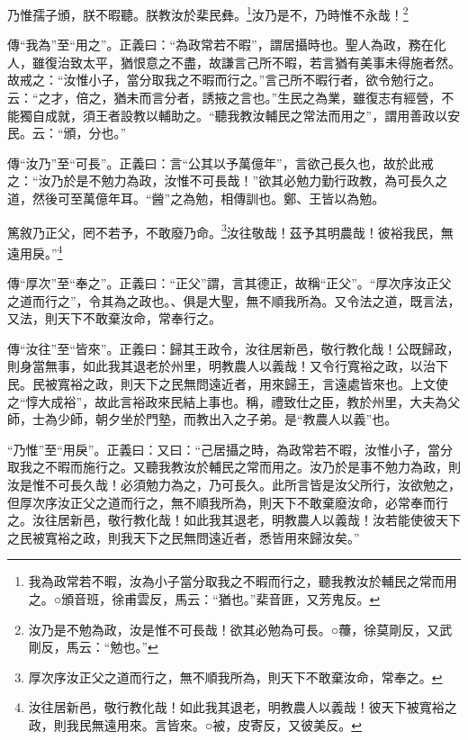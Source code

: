 乃惟孺子頒，朕不暇聽。朕教汝於棐民彝。\footnote{我為政常若不暇，汝為小子當分取我之不暇而行之，聽我教汝於輔民之常而用之。○頒音班，徐甫雲反，馬云：“猶也。”棐音匪，又芳鬼反。}汝乃是不，乃時惟不永哉！\footnote{汝乃是不勉為政，汝是惟不可長哉！欲其必勉為可長。○蘉，徐莫剛反，又武剛反，馬云：“勉也。”}

{\noindent\zhuan{}\fzbyks 傳“我為”至“用之”。正義曰：“為政常若不暇”，謂居攝時也。聖人為政，務在化人，雖復治致太平，猶恨意之不盡，故謙言己所不暇，若言猶有美事未得施者然。故戒之：“汝惟小子，當分取我之不暇而行之。”言己所不暇行者，欲令勉行之。云：“之才，倍之，猶未而言分者，誘掖之言也。”生民之為業，雖復志有經營，不能獨自成就，須王者設教以輔助之。“聽我教汝輔民之常法而用之”，謂用善政以安民。云：“頒，分也。” \par}

{\noindent\zhuan{}\fzbyks 傳“汝乃”至“可長”。正義曰：言“公其以予萬億年”，言欲己長久也，故於此戒之：“汝乃於是不勉力為政，汝惟不可長哉！”欲其必勉力勤行政教，為可長久之道，然後可至萬億年耳。“醟”之為勉，相傳訓也。鄭、王皆以為勉。 \par}

篤敘乃正父，罔不若予，不敢廢乃命。\footnote{厚次序汝正父之道而行之，無不順我所為，則天下不敢棄汝命，常奉之。}汝往敬哉！茲予其明農哉！彼裕我民，無遠用戾。”\footnote{汝往居新邑，敬行教化哉！如此我其退老，明教農人以義哉！彼天下被寬裕之政，則我民無遠用來。言皆來。○被，皮寄反，又彼美反。}

{\noindent\zhuan{}\fzbyks 傳“厚次”至“奉之”。正義曰：“正父”謂，言其德正，故稱“正父”。“厚次序汝正父之道而行之”，令其為之政也。、俱是大聖，無不順我所為。又令法之道，既言法，又法，則天下不敢棄汝命，常奉行之。 \par}

{\noindent\zhuan{}\fzbyks 傳“汝往”至“皆來”。正義曰：歸其王政令，汝往居新邑，敬行教化哉！公既歸政，則身當無事，如此我其退老於州里，明教農人以義哉！又令行寬裕之政，以治下民。民被寬裕之政，則天下之民無問遠近者，用來歸王，言遠處皆來也。上文使之“惇大成裕”，故此言裕政來民結上事也。稱，禮致仕之臣，教於州里，大夫為父師，士為少師，朝夕坐於門塾，而教出入之子弟。是“教農人以義”也。 \par}

{\noindent\shu{}\fzkt “乃惟”至“用戾”。正義曰：又曰：“己居攝之時，為政常若不暇，汝惟小子，當分取我之不暇而施行之。又聽我教汝於輔民之常而用之。汝乃於是事不勉力為政，則汝是惟不可長久哉！必須勉力為之，乃可長久。此所言皆是汝父所行，汝欲勉之，但厚次序汝正父之道而行之，無不順我所為，則天下不敢棄廢汝命，必常奉而行之。汝往居新邑，敬行教化哉！如此我其退老，明教農人以義哉！汝若能使彼天下之民被寬裕之政，則我天下之民無問遠近者，悉皆用來歸汝矣。” \par}

